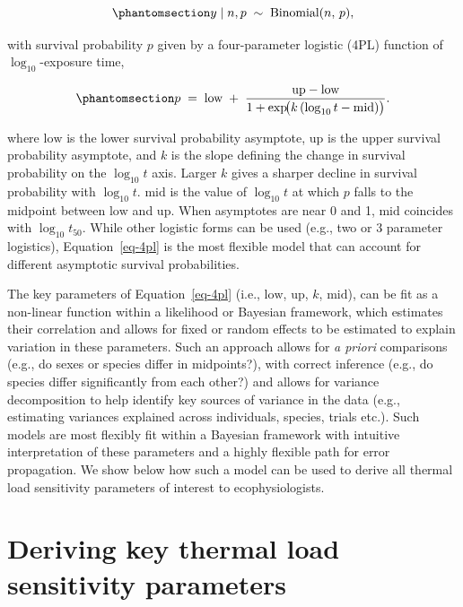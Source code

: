 \documentclass[
  11pt,
]{article}
\begin{document}
\begin{equation}\phantomsection\label{eq-likelihood}{
y \mid n, p \;\sim\; \text{Binomial}(n,\, p),
}\end{equation}

with survival probability \(p\) given by a four-parameter logistic (4PL)
function of \(\log_{10}\)-exposure time,

\begin{equation}\phantomsection\label{eq-4pl}{
p \;=\; \text{low} \;+\; \frac{\text{up} - \text{low}}{1 + \exp\!\bigl(k\,(\log_{10} t - \text{mid})\bigr)}.
}\end{equation}

where \(\text{low}\) is the lower survival probability asymptote,
\(\text{up}\) is the upper survival probability asymptote, and \(k\) is
the slope defining the change in survival probability on the
\(\log_{10} t\) axis. Larger \(k\) gives a sharper decline in survival
probability with \(\log_{10} t\). \(\text{mid}\) is the value of
\(\log_{10} t\) at which \(p\) falls to the midpoint between
\(\text{low}\) and \(\text{up}\). When asymptotes are near 0 and 1,
\(\text{mid}\) coincides with \(\log_{10}t_{50}\). While other logistic
forms can be used (e.g., two or 3 parameter logistics),
Equation~\ref{eq-4pl} is the most flexible model that can account for
different asymptotic survival probabilities.

The key parameters of Equation~\ref{eq-4pl} (i.e., \(\text{low}\),
\(\text{up}\), \(k\), \(\text{mid}\)), can be fit as a non-linear
function within a likelihood or Bayesian framework, which estimates
their correlation and allows for fixed or random effects to be estimated
to explain variation in these parameters. Such an approach allows for
\emph{a priori} comparisons (e.g., do sexes or species differ in
midpoints?), with correct inference (e.g., do species differ
significantly from each other?) and allows for variance decomposition to
help identify key sources of variance in the data (e.g., estimating
variances explained across individuals, species, trials etc.). Such
models are most flexibly fit within a Bayesian framework with intuitive
interpretation of these parameters and a highly flexible path for error
propagation. We show below how such a model can be used to derive all
thermal load sensitivity parameters of interest to ecophysiologists.

\section{Deriving key thermal load sensitivity
parameters}\label{deriving-key-thermal-load-sensitivity-parameters}
\end{document}
